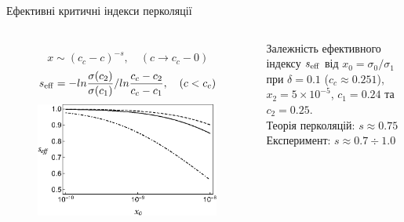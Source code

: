 \documentclass[10pt]{beamer}
\begin{document}
\begin{frame}{Ефективні критичні індекси перколяції}
\begin{columns}[T,onlytextwidth]
      \begin{figure}
        \centering
        $$x \sim (c_c-c)^{-s}, \quad (c \to c_c-0)$$
        $$s_{\rm eff} = - ln \frac{\sigma(c_2)}{\sigma(c_1)} / ln \frac{c_c-c_2}{c_c - c_1}, \quad (c<c_c)$$
        \includegraphics[width=0.99\textwidth]{images/seff3.eps}
      \end{figure}
      \hfill
      \begin{minipage}[t]{0.9\textwidth}
        Залежність ефективного індексу $s_{\rm eff}$ від $x_0 = \sigma_0/\sigma_1$ при  $\delta=0.1$ ($c_c \approx 0.251$), $x_2 = 5\times 10^{-5}$, $c_1 = 0.24$ та $c_2 = 0.25$.\\
        Теорія перколяцій: $s \approx 0.75$\\
        Експеримент: $s\approx 0.7 \div 1.0$
      \end{minipage}
\end{columns}

\end{frame}
\end{document}
